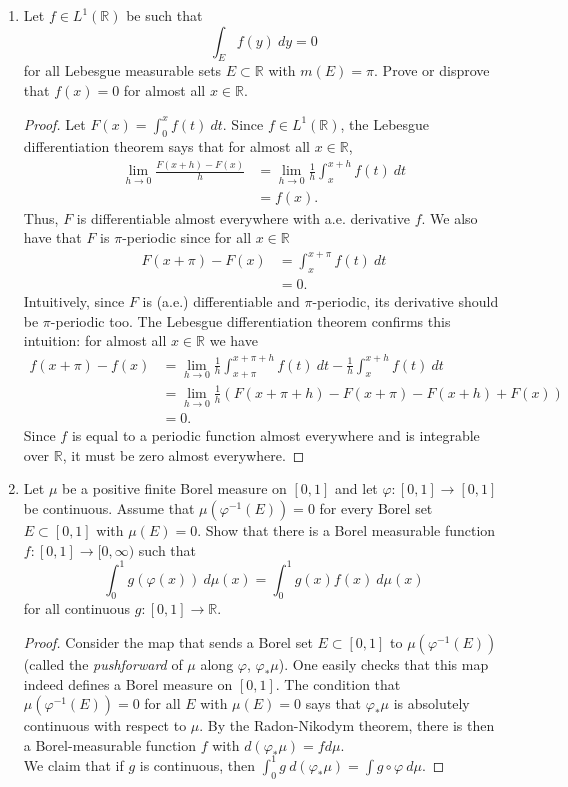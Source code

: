\documentclass[11pt,letterpaper]{report}
\newcommand{\reals}{\mathbb{R}}
\begin{document}
\begin{enumerate}
	\item Let $f\in L^1(\reals)$ be such that
	\[
	\int_Ef(y)\ dy = 0
	\]
	for all Lebesgue measurable sets $E\subset \reals$ with $m(E) = \pi$. Prove or disprove that $f(x) = 0$ for almost all $x\in \reals$.
	\begin{proof}
		Let $F(x) = \int_0^xf(t)\ dt$. Since $f\in L^1(\reals)$, the Lebesgue differentiation theorem says that for almost all $x\in \reals$,
		\begin{align*}
			\lim_{h\to 0}\frac{F(x+h)-F(x)}{h} &= \lim_{h\to 0}\frac{1}{h}\int_x^{x+h}f(t)\ dt\\
			&= f(x).
		\end{align*}
		Thus, $F$ is differentiable almost everywhere with a.e. derivative $f$. We also have that $F$ is $\pi$-periodic since for all $x\in \reals$
		\begin{align*}
			F(x+\pi)-F(x) &= \int_x^{x+\pi}f(t)\ dt\\
			&= 0.
		\end{align*}
		Intuitively, since $F$ is (a.e.) differentiable and $\pi$-periodic, its derivative should be $\pi$-periodic too. The Lebesgue differentiation theorem confirms this intuition: for almost all $x\in \reals$ we have
		\begin{align*}
			f(x+\pi)-f(x) &= \lim_{h\to 0}\frac{1}{h}\int_{x+\pi}^{x+\pi+h}f(t)\ dt -\frac{1}{h}\int_x^{x+h}f(t)\ dt\\
			&= \lim_{h\to 0}\frac{1}{h}(F(x+\pi+h)-F(x+\pi)-F(x+h)+F(x))\\
			&= 0.
		\end{align*}
		Since $f$ is equal to a periodic function almost everywhere and is integrable over $\reals$, it must be zero almost everywhere.
	\end{proof}

	\item Let $\mu$ be a positive finite Borel measure on $[0,1]$ and let $\varphi: [0,1]\to [0,1]$ be continuous. Assume that $\mu(\varphi^{-1}(E)) = 0$ for every Borel set $E\subset [0,1]$ with $\mu(E) = 0$. Show that there is a Borel measurable function $f:[0,1]\to [0, \infty)$ such that
	\[
	\int_0^1g(\varphi(x))\ d\mu(x) = \int_0^1g(x)f(x)\ d\mu(x)
	\]
	for all continuous $g: [0,1]\to \reals$.
	\begin{proof}
		Consider the map that sends a Borel set $E\subset [0,1]$ to $\mu(\varphi^{-1}(E))$ (called the \textit{pushforward} of $\mu$ along $\varphi$, $\varphi_*\mu$). One easily checks that this map indeed defines a Borel measure on $[0,1]$. The condition that $\mu(\varphi^{-1}(E)) = 0$ for all $E$ with $\mu(E) = 0$ says that $\varphi_*\mu$ is absolutely continuous with respect to $\mu$. By the Radon-Nikodym theorem, there is then a Borel-measurable function $f$ with $d(\varphi_*\mu) = fd\mu$.\\

		\noindent We claim that if $g$ is continuous, then $\int_0^1g\ d(\varphi_*\mu) = \int g\circ \varphi\ d\mu$.
	\end{proof}
\end{enumerate}
\end{document}
